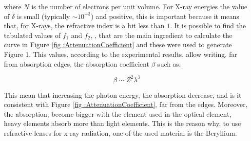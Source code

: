 \begin{flushleft}

where $N $ is the number of electrons per unit volume. For X-ray energies the value of $\delta $ is small (typically $\sim 10^{-3} $) and positive, this is important because it means that, for X-rays, the refractive index is a bit less than $1 $. It is possible to find the tabulated values of $f_1 $ and $f_2 $, \cite{henke1981atomic}, that are the main ingredient to calculate the curve in Figure \ref{fig :AttenuationCoefficient}  and these were used to generate Figure 1. This values, according to the experimental results, allow writing, far from absorption edges, the absorption coefficient $\beta $ such as:
\end{flushleft}
\begin{equation}
\beta \sim Z^2 \lambda^3
\label{eq: new beta}
\end{equation}
\begin{flushleft}
This mean that increasing the photon energy, the absorption decrease, and is it consistent with Figure \ref{fig :AttenuationCoefficient}, far from the edges. Moreover, the absorption, become bigger with the element used in the optical element, heavy elements absorb more than light elements. This is the reason why, to use refractive lenses for x-ray radiation, one of the used material is the Beryllium.
\end{flushleft}
